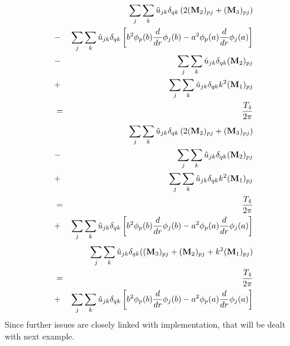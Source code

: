 \begin{eqnarray} \label{bdyt}
&&  \sum_j \sum_k \hat{u}_{jk} \delta_{qk} \left(2 ({\bf M}_2)_{pj} + ({\bf M}_3)_{pj} \right) \\
&-& \sum_j \sum_k \hat{u}_{jk} \delta_{qk} \left[ b^2\phi_p(b)\frac{d}{dr}\phi_j(b) - a^2\phi_p(a)\frac{d}{dr}\phi_j(a) \right] \\
&-& \sum_j \sum_k \hat{u}_{jk} \delta_{qk} ({\bf M}_2)_{pj}     \\
&+& \sum_j \sum_k \hat{u}_{jk} \delta_{qk} k^2 ({\bf M}_1)_{pj} \\
&=& \frac{T_4}{2\pi}
\end{eqnarray}
\begin{eqnarray} \label{bdyt}
&&  \sum_j \sum_k \hat{u}_{jk} \delta_{qk} \left(2 ({\bf M}_2)_{pj} + ({\bf M}_3)_{pj} \right) \\
&-& \sum_j \sum_k \hat{u}_{jk} \delta_{qk} ({\bf M}_2)_{pj}     \\
&+& \sum_j \sum_k \hat{u}_{jk} \delta_{qk} k^2 ({\bf M}_1)_{pj} \\
&=& \frac{T_4}{2\pi} \\
&+& \sum_j \sum_k \hat{u}_{jk} \delta_{qk} \left[
b^2\phi_p(b)\frac{d}{dr}\phi_j(b) -
a^2\phi_p(a)\frac{d}{dr}\phi_j(a) \right]
\end{eqnarray}
\begin{eqnarray} \label{bdyt}
&&  \sum_j \sum_k \hat{u}_{jk} \delta_{qk}  (({\bf M}_3)_{pj} + ({\bf M}_2)_{pj} + k^2 ({\bf M}_1)_{pj}) \\
&=& \frac{T_4}{2\pi} \\
&+& \sum_j \sum_k \hat{u}_{jk} \delta_{qk} \left[
b^2\phi_p(b)\frac{d}{dr}\phi_j(b) -
a^2\phi_p(a)\frac{d}{dr}\phi_j(a) \right]
\end{eqnarray}
Since further issues are closely linked with implementation, that
will be dealt with next example.
